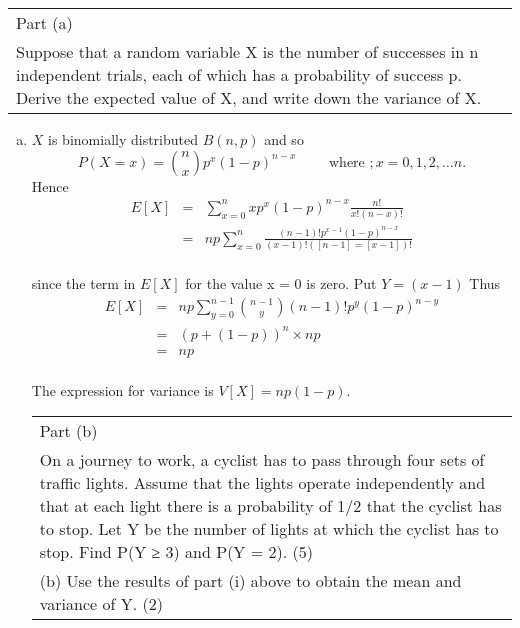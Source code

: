\documentclass[a4paper,12pt]{article}
\begin{document}
  \begin{table}[ht!]
  \centering
  \begin{tabular}{|p{15cm}|}
  \hline
Part (a) \\  
Suppose that a random variable X is the number of successes in n independent trials, each of which has a probability of success p.  Derive the expected value of X, and write down the variance of X.\\
  \hline
   \end{tabular}
 \end{table}



\begin{enumerate}[(a)]
\item  $X$ is binomially distributed $B(n, p)$ and so 
\[P(X = x) = { n \choose x} p^x(1 - p)^{n-x}  \qquad \mbox{ where }; x =
0, 1, 2, \ldots n.\]
Hence
\begin{eqnarray*}
E[X] 
&=&  \sum^{n}_{x=0}xp^{x} (1-p)^{n-x} \frac{n!}{x!(n-x)!}\\
&=&  np \sum^{n}_{x=0} \frac{(n-1)! p^{x-1}(1-p)^{n-x}}{(x-1)!([n-1]=[x-1])!}\\
\end{eqnarray*}

since the term in $E[X]$ for the value x = 0 is zero. Put $Y = (x - 1)$
Thus
\begin{eqnarray*}
E[X] 
&=&  np \sum^{n-1}_{y=0} {{n-1}\choose y} (n-1)! p^{y}(1-p)^{n-y}\\
&=& (p+(1-p))^n \times np\\
&=& np \\
\end{eqnarray*}

The expression for variance is $V [X] = np(1 - p).$

\newpage
  \begin{table}[ht!]
  \centering
  \begin{tabular}{|p{15cm}|}
  \hline
Part (b) \\  
On a journey to work, a cyclist has to pass through four sets of traffic lights.  Assume that the lights operate independently and that at each light there is a probability of 1/2 that the cyclist has to stop.  Let Y be the number of lights at which the cyclist has to stop.  Find  P(Y ≥ 3) and P(Y = 2). (5) 
\\ 
(b) Use the results of part (i) above to obtain the mean and variance of Y. (2) \\    \hline
   \end{tabular}
 \end{table}



\end{enumerate}
\end{document}
